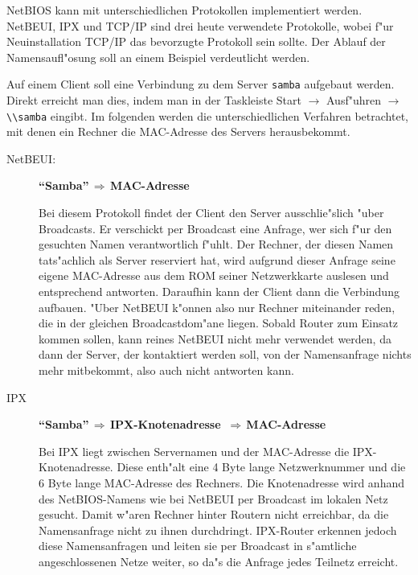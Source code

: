 \documentclass{scrartcl}\usepackage{pslatex}\typearea{12}
\newcommand{\nbname}{\texttt}
\begin{document}
NetBIOS kann mit unterschiedlichen Protokollen implementiert werden.
NetBEUI, IPX und TCP/IP sind drei heute verwendete Protokolle, wobei
f"ur Neuinstallation TCP/IP das bevorzugte Protokoll sein sollte.
Der Ablauf der Namensaufl"osung soll an einem
Beispiel verdeutlicht werden.

Auf einem Client soll eine Verbindung zu dem Server \nbname{samba}
aufgebaut werden. Direkt erreicht man dies, indem man in der Taskleiste
Start $\rightarrow$ Ausf"uhren $\rightarrow$ \verb|\\samba| eingibt.
Im folgenden werden die unterschiedlichen Verfahren betrachtet, mit
denen ein Rechner die MAC-Adresse des Servers herausbekommt.

\begin{description}

\item[NetBEUI:]

  \textbf{"`Samba"'$\,\Rightarrow\,$MAC-Adresse}
  
  Bei diesem Protokoll findet der Client den Server ausschlie"slich
  "uber Broadcasts. Er verschickt per Broadcast eine Anfrage, wer sich
  f"ur den gesuchten Namen verantwortlich f"uhlt. Der Rechner, der
  diesen Namen tats"achlich als Server reserviert hat, wird aufgrund
  dieser Anfrage seine eigene MAC-Adresse aus dem ROM seiner
  Netzwerkkarte auslesen und entsprechend antworten. Daraufhin kann
  der Client dann die Verbindung aufbauen. "Uber NetBEUI k"onnen also
  nur Rechner miteinander reden, die in der gleichen Broadcastdom"ane
  liegen. Sobald Router zum Einsatz kommen sollen, kann reines NetBEUI
  nicht mehr verwendet werden, da dann der Server, der kontaktiert
  werden soll, von der Namensanfrage nichts mehr mitbekommt, also auch
  nicht antworten kann.
  
\item[IPX]
  
  \textbf{"`Samba"'$\,\Rightarrow\,$IPX-Knotenadresse
    $\,\Rightarrow\,$MAC-Adresse}
  
  Bei IPX liegt zwischen Servernamen und der MAC-Adresse die
  IPX-Knotenadresse. Diese enth"alt eine 4 Byte lange Netzwerknummer
  und die 6 Byte lange MAC-Adresse des Rechners. Die Knotenadresse
  wird anhand des NetBIOS-Namens wie bei NetBEUI per Broadcast im
  lokalen Netz gesucht. Damit w"aren Rechner hinter Routern nicht
  erreichbar, da die Namensanfrage nicht zu ihnen durchdringt.
  IPX-Router erkennen jedoch diese Namensanfragen und leiten sie per
  Broadcast in s"amtliche angeschlossenen Netze weiter, so da"s die
  Anfrage jedes Teilnetz erreicht.
  

\end{description}
\end{document}
